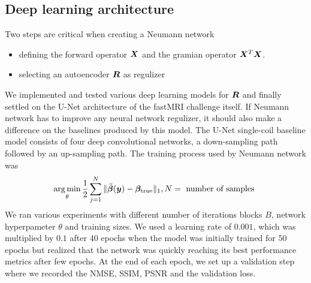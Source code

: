 \documentclass{article}
\begin{document}
\subsection{Deep learning architecture}
Two steps are critical when creating a Neumann network
\begin{itemize}
\item defining the forward operator $\bm{X}$ and the gramian operator $\bm{X}^T \bm{X}$.
\item selecting an autoencoder $\bm{R}$ as regulizer
\end{itemize}

We implemented and tested various deep learning models for $\bm{R}$ and finally settled on the U-Net architecture  of the fastMRI challenge itself. If Neumann network has to improve any neural network regulizer, it should also make a difference on the baselines produced by this model. The U-Net single-coil baseline model consists of four deep convolutional networks, a down-sampling path followed by an up-sampling path. The training process used by Neumann network was
$$
	\operatorname*{arg\,min}_\theta \frac{1}{2} \sum_{j=1}^N \| \tilde{\bm{\beta}}(\bm{y}) - \bm{\beta}_{\text{true}} \|_1, N=\text{ number of samples }
$$
     We ran various experiments with different number of iterations blocks $B$, network hyperpameter $\theta$ and training sizes.
     We used a learning rate of $0.001$, which was multiplied by $0.1$ after $40$ epochs when the model was initially trained for $50$ epochs but realized that the network was quickly reaching its best performance metrics after few epochs. At the end of each epoch, we set up a validation step where we recorded the NMSE, SSIM, PSNR and the validation loss.
   
\end{document}
